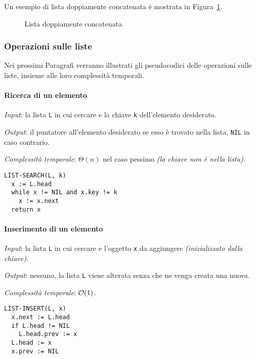 \documentclass[italian, 10pt]{article}
\begin{document}
\bigskip
Un esempio di lista doppiamente concatenata è mostrata in Figura~\ref{fig:lista-doppiamente-concatenata}.

\begin{figure}[htbp]
  \bigskip
  \centering
  \caption{Lista doppiamente concatenata}
  \label{fig:lista-doppiamente-concatenata}
  \bigskip
\end{figure}

\subsubsection{Operazioni sulle liste}

Nei prossimi Paragrafi verranno illustrati gli pseudocodici delle operazioni sulle liste, insieme alle loro complessità temporali.

\paragraph{Ricerca di un elemento}

\textit{Input}: la lista \texttt{L} in cui cercare e la chiave \texttt{k} dell'elemento desiderato.

\textit{Output}: il puntatore all'elemento desiderato se esso è trovato nella lista, \texttt{NIL} in caso contrario.

\textit{Complessità temporale}: \(\Theta(n)\) nel caso pessimo \textit{(la chiave non è nella lista)}.

\begin{lstlisting}[style=pseudocode, caption={Pseudocodice dell'algoritmo \texttt{LIST-SEARCH}}, label={lst:list-search}]
LIST-SEARCH(L, k)
  x := L.head
  while x != NIL and x.key != k
    x := x.next
  return x
\end{lstlisting}

\paragraph{Inserimento di un elemento}

\textit{Input}: la lista \texttt{L} in cui cercare e l'oggetto \texttt{x} da aggiungere \textit{(inizializzato dalla chiave)}.

\textit{Output}: nessuno, la lista \texttt{L} viene alterata senza che ne venga creata una nuova.

\textit{Complessità temporale}: \(\mathcal{O}(1)\).

\begin{lstlisting}[style=pseudocode, caption={Pseudocodice dell'algoritmo \texttt{LIST-INSERT}}, label={lst:list-insert}]
LIST-INSERT(L, x)
  x.next := L.head
  if L.head != NIL
    L.head.prev := x
  L.head := x
  x.prev := NIL
  \end{lstlisting}
\end{document}
